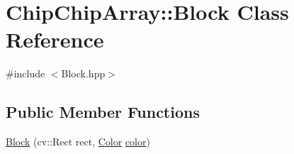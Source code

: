 \hypertarget{classChipChipArray_1_1Block}{\section{Chip\+Chip\+Array\+:\+:Block Class Reference}
\label{classChipChipArray_1_1Block}
}


{\ttfamily \#include $<$Block.\+hpp$>$}

\subsection*{Public Member Functions}
\begin{DoxyCompactItemize}
\item 
\hyperlink{classChipChipArray_1_1Block_a7eb2456e5c95c8a91844c9522eed0578}{Block} (cv\+::\+Rect rect, \hyperlink{definitions_8hpp_abc05a0f46084a3477cf5d5c939ff1436}{Color} \hyperlink{classChipChipArray_1_1Block_a262210a9a04028f3f2670c9ae38ef3d7}{color})
\end{DoxyCompactItemize}

